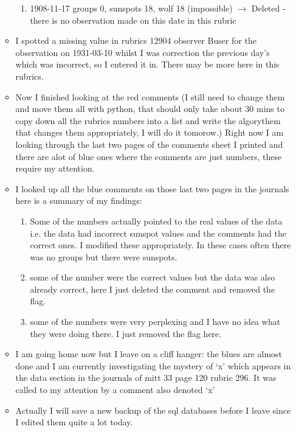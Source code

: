\documentclass[12pt]{article}
\begin{document}
\begin{itemize}
\begin{itemize}
\begin{enumerate}
            \item 1908-11-17 groups 0, sunspots 18, wolf 18 (impossible) $\to$ Deleted - there is no observation made on this date in this rubric
        \end{enumerate}
        \item I spotted a missing value in rubrics 12904 observer Buser for the observation on 1931-03-10 whilst I was correction the previous day's which was incorrect, so I entered it in. There may be more here in this rubrics.
        \item Now I finished looking at the red comments (I still need to change them and move them all with python, that should only take about 30 mins to copy down all the rubrics numbers into a list and write the algorythem that changes them appropriately, I will do it tomorow.) Right now I am looking through the last two pages of the comments sheet I printed and there are alot of blue ones where the comments are just numbers, these require my attention.
        \item I looked up all the blue comments on those last two pages in the journals here is a summary of my findings:
        \begin{enumerate}
            \item Some of the numbers actually pointed to the real values of the data i.e. the data had incorrect sunspot values and the comments had the correct ones. I modified these appropriately. In these cases often there was no groups but there were sunspots.
            \item some of the number were the correct values but the data was also already correct, here I just deleted the comment and removed the flag.
            \item some of the numbers were very perplexing and I have no idea what they were doing there. I just removed the flag here.
        \end{enumerate}
        \item I am going home now but I leave on a cliff hanger: the blues are almost done and I am currently investigating the mystery of `x' which appears in the data section in the journals of mitt 33 page 120 rubric 296. It was called to my attention by a comment also denoted `x'
        \item Actually I will save a new backup of the sql databases before I leave since I edited them quite a lot today.
        \end{itemize}
        

\end{itemize}
\end{document}
